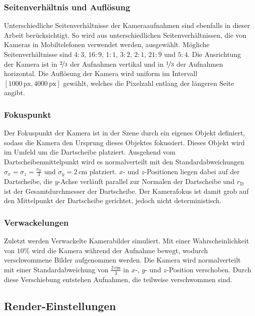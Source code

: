 \subsubsection{Seitenverhältnis und Auflösung}

Unterschiedliche Seitenverhältnisse der Kameraaufnahmen sind ebenfalls in dieser Arbeit berücksichtigt. So wird aus unterschiedlichen Seitenverhältnissen, die von Kameras in Mobiltelefonen verwendet werden, ausgewählt. Mögliche Seitenverhältnisse sind $4:3$, $16:9$, $1:1$, $3:2$, $2:1$, $21:9$ und $5:4$. Die Ausrichtung der Kamera ist in $\nicefrac{2}{3}$ der Aufnahmen vertikal und in $\nicefrac{1}{3}$ der Aufnahmen horizontal. Die Auflösung der Kamera wird uniform im Intervall $[1000\,\text{px}, 4000\,\text{px}]$ gewählt, welches die Pixelzahl entlang der längeren Seite angibt.

\subsubsection{Fokuspunkt}

Der Fokuspunkt der Kamera ist in der Szene durch ein eigenes Objekt definiert, sodass die Kamera den Ursprung dieses Objektes fokussiert. Dieses Objekt wird im Umfeld um die Dartscheibe platziert. Ausgehend vom Dartscheibenmittelpunkt wird es normalverteilt mit den Standardabweichungen $\sigma_x = \sigma_z = \frac{r_\text{D}}{3}$ und $\sigma_y = 2\,\text{cm}$ platziert. $x$- und $z$-Positionen liegen dabei auf der Dartscheibe, die $y$-Achse verläuft parallel zur Normalen der Dartscheibe und $r_\text{D}$ ist der Gesamtdurchmesser der Dartscheibe. Der Kamerafokus ist damit grob auf den Mittelpunkt der Dartscheibe gerichtet, jedoch nicht deterministisch.

\subsubsection{Verwackelungen}

Zuletzt werden Verwackelte Kamerabilder simuliert. Mit einer Wahrscheinlichkeit von $10\%$ wird die Kamera während der Aufnahme bewegt, wodurch verschwommene Bilder aufgenommen werden. Die Kamera wird normalverteilt mit einer Standardabweichung von $\frac{2\,\text{cm}}{3}$ in $x$-, $y$- und $z$-Position verschoben. Durch diese Verschiebung entstehen Aufnahmen, die teilweise verschwommen sind.

\subsection{Render-Einstellungen}  %
\label{sec:render_einstellungen}

